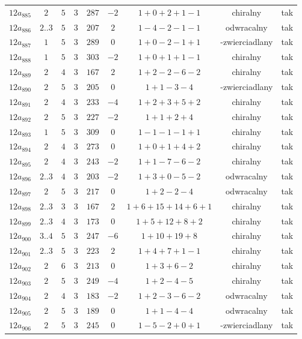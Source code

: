 \begin{longtable}{ccccccccc}
$12a_{885}$ & $2$ & $5$ & $3$ & $287$ & $-2$ & $1+0+2+1-1$ & chiralny & tak \\
$12a_{886}$ & $2..3$ & $5$ & $3$ & $207$ & $2$ & $1-4-2-1-1$ & odwracalny & tak \\
$12a_{887}$ & $1$ & $5$ & $3$ & $289$ & $0$ & $1+0-2-1+1$ & -zwierciadlany & tak \\
$12a_{888}$ & $1$ & $5$ & $3$ & $303$ & $-2$ & $1+0+1+1-1$ & chiralny & tak \\
$12a_{889}$ & $2$ & $4$ & $3$ & $167$ & $2$ & $1+2-2-6-2$ & chiralny & tak \\
$12a_{890}$ & $2$ & $5$ & $3$ & $205$ & $0$ & $1+1-3-4$ & -zwierciadlany & tak \\
$12a_{891}$ & $2$ & $4$ & $3$ & $233$ & $-4$ & $1+2+3+5+2$ & chiralny & tak \\
$12a_{892}$ & $2$ & $5$ & $3$ & $227$ & $-2$ & $1+1+2+4$ & chiralny & tak \\
$12a_{893}$ & $1$ & $5$ & $3$ & $309$ & $0$ & $1-1-1-1+1$ & chiralny & tak \\
$12a_{894}$ & $2$ & $4$ & $3$ & $273$ & $0$ & $1+0+1+4+2$ & chiralny & tak \\
$12a_{895}$ & $2$ & $4$ & $3$ & $243$ & $-2$ & $1+1-7-6-2$ & chiralny & tak \\
$12a_{896}$ & $2..3$ & $4$ & $3$ & $203$ & $-2$ & $1+3+0-5-2$ & odwracalny & tak \\
$12a_{897}$ & $2$ & $5$ & $3$ & $217$ & $0$ & $1+2-2-4$ & odwracalny & tak \\
$12a_{898}$ & $2..3$ & $3$ & $3$ & $167$ & $2$ & $1+6+15+14+6+1$ & chiralny & tak \\
$12a_{899}$ & $2..3$ & $4$ & $3$ & $173$ & $0$ & $1+5+12+8+2$ & chiralny & tak \\
$12a_{900}$ & $3..4$ & $5$ & $3$ & $247$ & $-6$ & $1+10+19+8$ & chiralny & tak \\
$12a_{901}$ & $2..3$ & $5$ & $3$ & $223$ & $2$ & $1+4+7+1-1$ & chiralny & tak \\
$12a_{902}$ & $2$ & $6$ & $3$ & $213$ & $0$ & $1+3+6-2$ & chiralny & tak \\
$12a_{903}$ & $2$ & $5$ & $3$ & $249$ & $-4$ & $1+2-4-5$ & chiralny & tak \\
$12a_{904}$ & $2$ & $4$ & $3$ & $183$ & $-2$ & $1+2-3-6-2$ & odwracalny & tak \\
$12a_{905}$ & $2$ & $5$ & $3$ & $189$ & $0$ & $1+1-4-4$ & odwracalny & tak \\
$12a_{906}$ & $2$ & $5$ & $3$ & $245$ & $0$ & $1-5-2+0+1$ & -zwierciadlany & tak \\

\end{longtable}
